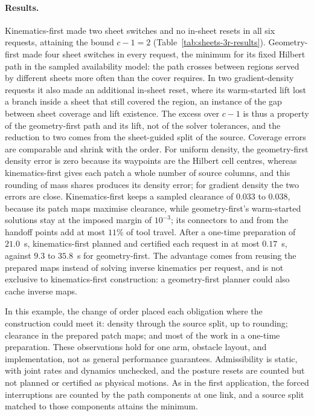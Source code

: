 \paragraph{Results.}
Kinematics-first made two sheet switches and no in-sheet resets in all six requests, attaining the bound $c-1=2$ (Table~\ref{tab:sheets-3r-results}). Geometry-first made four sheet switches in every request, the minimum for its fixed Hilbert path in the sampled availability model: the path crosses between regions served by different sheets more often than the cover requires. In two gradient-density requests it also made an additional in-sheet reset, where its warm-started lift lost a branch inside a sheet that still covered the region, an instance of the gap between sheet coverage and lift existence. The excess over $c-1$ is thus a property of the geometry-first path and its lift, not of the solver tolerances, and the reduction to two comes from the sheet-guided split of the source. Coverage errors are comparable and shrink with the order. For uniform density, the geometry-first density error is zero because its waypoints are the Hilbert cell centres, whereas kinematics-first gives each patch a whole number of source columns, and this rounding of mass shares produces its density error; for gradient density the two errors are close. Kinematics-first keeps a sampled clearance of $0.033$ to $0.038$, because its patch maps maximise clearance, while geometry-first's warm-started solutions stay at the imposed margin of $10^{-3}$; its connectors to and from the handoff points add at most $11\%$ of tool travel. After a one-time preparation of $21.0$~s, kinematics-first planned and certified each request in at most $0.17$~s, against $9.3$ to $35.8$~s for geometry-first. The advantage comes from reusing the prepared maps instead of solving inverse kinematics per request, and is not exclusive to kinematics-first construction: a geometry-first planner could also cache inverse maps.



In this example, the change of order placed each obligation where the construction could meet it: density through the source split, up to rounding; clearance in the prepared patch maps; and most of the work in a one-time preparation. These observations hold for one arm, obstacle layout, and implementation, not as general performance guarantees. Admissibility is static, with joint rates and dynamics unchecked, and the posture resets are counted but not planned or certified as physical motions. As in the first application, the forced interruptions are counted by the path components at one link, and a source split matched to those components attains the minimum.

